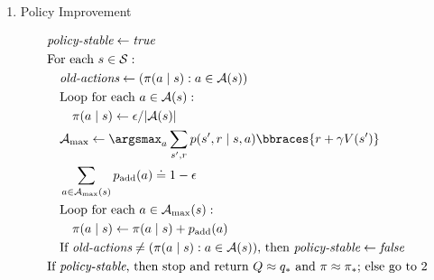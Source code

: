 \begin{solution}
\begin{tcolorbox}[title = Policy Iteration (using iterative policy evaluation) for estimating $\pi \approx \pi_\ast$]
\begin{enumerate}[label = \arabic*.]
        \item Policy Improvement

        \begin{align*}
            & \textit{policy-stable} \leftarrow \textit{true} \\
            & \text{For each $s \in \mathcal S$}: \\
            & \quad \textit{old-actions} \leftarrow (\pi(a \mid s): a \in \mathcal A(s)) \\
            & \quad \text{Loop for each $a \in \mathcal A(s)$}: \\
            & \quad \quad \pi(a \mid s) \leftarrow \epsilon / |\mathcal A(s)| \\
            & \quad \mathcal A_\text{max} \leftarrow \argsmax_a \sum_{s^\prime, r} p(s^\prime, r \mid s, a) \bbraces{r + \gamma V(s^\prime)} \\
            & \quad \sum_{a \in \mathcal A_\text{max}(s)} p_\text{add}(a) \doteq 1 - \epsilon \\
            & \quad \text{Loop for each $a \in \mathcal A_\text{max}(s)$}: \\
            & \quad \quad \pi(a \mid s) \leftarrow \pi(a \mid s) + p_\text{add}(a) \\
            & \quad \text{If $\textit{old-actions} \neq (\pi(a \mid s): a \in \mathcal A(s))$, then $\textit{policy-stable} \leftarrow \textit{false}$} \\
            & \text{If $\textit{policy-stable}$, then stop and return $Q \approx q_\ast$ and $\pi \approx \pi_\ast$; else go to $2$}
        \end{align*}

    \end{enumerate}

\end{tcolorbox}

\end{solution}

